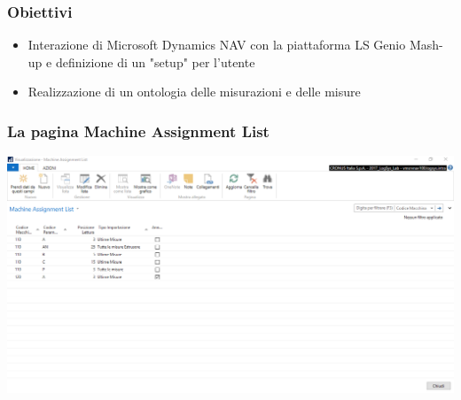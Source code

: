 \documentclass{beamer}
\begin{document}
\begin{frame}
\frametitle{Obiettivi}
\begin{itemize}
	\item Interazione di Microsoft Dynamics NAV con la piattaforma LS Genio Mash-up e definizione di un "setup" per l'utente
	
	\item Realizzazione di un ontologia delle misurazioni e delle misure
\end{itemize}	
\end{frame}

\begin{frame}
\frametitle{La pagina Machine Assignment List}
\includegraphics[width=1\textwidth]{images/MachineAssignmentList2.png}
\end{frame}



\end{document}

